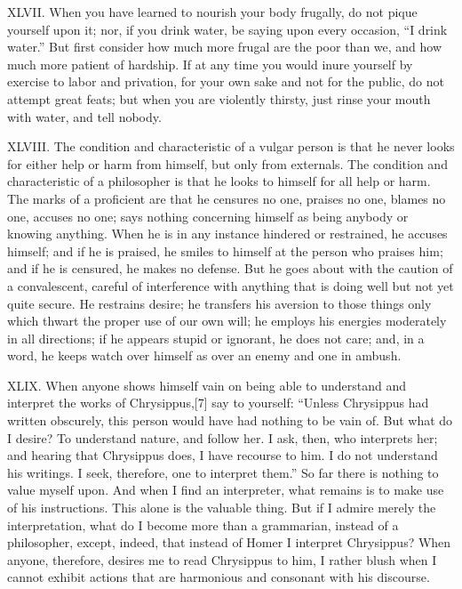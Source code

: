 \documentclass[a4paper]{article}
\begin{document}
XLVII. When you have learned to nourish your body frugally, do not pique
yourself upon it; nor, if you drink water, be saying upon every occasion,
“I drink water.” But first consider how much more frugal are the poor
than we, and how much more patient of hardship. If at any time you would
inure yourself by exercise to labor and privation, for your own sake and
not for the public, do not attempt great feats; but when you are
violently thirsty, just rinse your mouth with water, and tell nobody.


XLVIII. The condition and characteristic of a vulgar person is that he never
looks for either help or harm from himself, but only from externals. The
condition and characteristic of a philosopher is that he looks to himself
for all help or harm. The marks of a proficient are that he censures no
one, praises no one, blames no one, accuses no one; says nothing
concerning himself as being anybody or knowing anything. When he is in
any instance hindered or restrained, he accuses himself; and if he is
praised, he smiles to himself at the person who praises him; and if he is
censured, he makes no defense. But he goes about with the caution of a
convalescent, careful of interference with anything that is doing well
but not yet quite secure. He restrains desire; he transfers his aversion
to those things only which thwart the proper use of our own will; he
employs his energies moderately in all directions; if he appears stupid
or ignorant, he does not care; and, in a word, he keeps watch over
himself as over an enemy and one in ambush.


XLIX. When anyone shows himself vain on being able to understand and interpret
the works of Chrysippus,[7] say to yourself: “Unless Chrysippus had
written obscurely, this person would have had nothing to be vain of. But
what do I desire? To understand nature, and follow her. I ask, then, who
interprets her; and hearing that Chrysippus does, I have recourse to him.
I do not understand his writings. I seek, therefore, one to interpret
them.” So far there is nothing to value myself upon. And when I find an
interpreter, what remains is to make use of his instructions. This alone
is the valuable thing. But if I admire merely the interpretation, what do
I become more than a grammarian, instead of a philosopher, except,
indeed, that instead of Homer I interpret Chrysippus? When anyone,
therefore, desires me to read Chrysippus to him, I rather blush when I
cannot exhibit actions that are harmonious and consonant with his
discourse.
\end{document}
